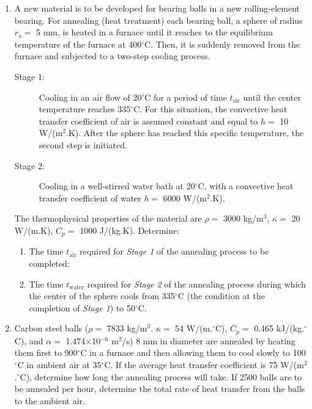 \documentclass[12pts,a4paper,amsmath,amssymb,floatfix]{article}%
\begin{document}
\begin{enumerate}[label=\bfseries Problem \arabic*:]
\item\label{Problem:Analytical_Prob1} A new material is to be developed for bearing balls in a new rolling-element bearing. For annealing (heat treatment) each bearing ball, a sphere of radius $r_{o} =$ 5 mm, is heated in a furnace until it reaches to the equilibrium temperature of the furnace at 400$^{\circ}$C. Then, it is suddenly removed from the furnace and subjected to a two-step cooling process.
   \begin{description}
      \item[Stage 1:] Cooling in an air flow of 20$^{\circ}$C for a period of time $t_{\text{air}}$ until the center temperature reaches 335$^{\circ}$C. For this situation, the convective heat transfer coefficient of air is assumed constant and equal to $h =$ 10 W/(m$^{2}$.K). After the sphere has reached this specific temperature, the second step is initiated. 
      \item[Stage 2:] Cooling in a well-stirred water bath at 20$^{\circ}$C, with a convective heat transfer coefficient of water $h =$ 6000 W/(m$^{2}$.K). 
   \end{description}
   The thermophysical properties of the material are $\rho =$ 3000 kg/m$^{3}$, $\kappa =$ 20 W/(m.K), $C_{p} =$ 1000 J/(kg.K). Determine:
   \begin{enumerate}%
      \item The time $t_{\text{air}}$ required for {\it Stage 1} of the annealing process to be completed;
      \item The time $t_{\text{water}}$ required for {\it Stage 2} of the annealing process during which the center of the sphere cools from 335$^{\circ}$C (the condition at the completion of {\it Stage 1}) to 50$^{\circ}$C. 
   \end{enumerate}

\item\label{Problem:Lumped_Prob2} Carbon steel balls ($\rho=$ 7833 kg/m$^{3}$, $\kappa=$ 54 W/(m.$^{\circ}$C), $C_{p}=$ 0.465 kJ/(kg.$^{\circ}$C), and $\alpha=$ 1.474$\times$10$^{-6}$ m$^{2}$/s) 8 mm in diameter are annealed by heating them first to 900$^{\circ}$C in a furnace and then allowing them to cool slowly to 100$^{\circ}$C in ambient air at 35$^{\circ}$C. If the average heat transfer coefficient is 75 W/(m$^{2}$.$^{\circ}$C), determine how long the annealing process will take. If 2500 balls are to be annealed per hour, determine the total rate of heat transfer from the balls to the ambient air.


\end{enumerate}
\end{document}
